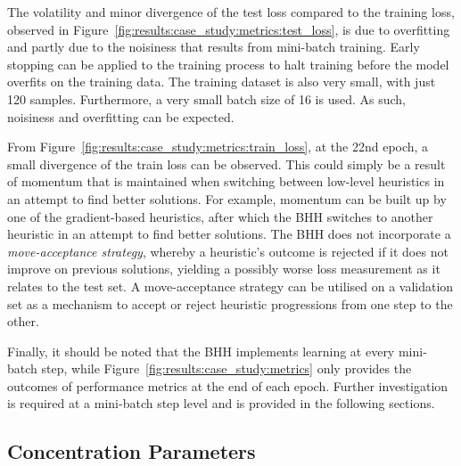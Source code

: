 The volatility and minor divergence of the test loss compared to the training loss, observed in Figure~\ref{fig:results:case_study:metrics:test_loss}, is due to overfitting and partly due to the noisiness that results from mini-batch training. Early stopping can be applied to the training process to halt training before the model overfits on the training data. The training dataset is also very small, with just 120 samples. Furthermore, a very small batch size of 16 is used. As such, noisiness and overfitting can be expected.

From Figure~\ref{fig:results:case_study:metrics:train_loss}, at the 22nd epoch, a small divergence of the train loss can be observed. This could simply be a result of momentum that is maintained when switching between low-level heuristics in an attempt to find better solutions. For example, momentum can be built up by one of the gradient-based heuristics, after which the \acs{BHH} switches to another heuristic in an attempt to find better solutions. The \acs{BHH} does not incorporate a \textit{move-acceptance strategy}, whereby a heuristic's outcome is rejected if it does not improve on previous solutions, yielding a possibly worse loss measurement as it relates to the test set. A move-acceptance strategy can be utilised on a validation set as a mechanism to accept or reject heuristic progressions from one step to the other.

Finally, it should be noted that the \acs{BHH} implements learning at every mini-batch step, while Figure~\ref{fig:results:case_study:metrics} only provides the outcomes of performance metrics at the end of each epoch. Further investigation is required at a mini-batch step level and is provided in the following sections.



\subsection{Concentration Parameters}\label{sec:results:case_study:concentration_parameters}

